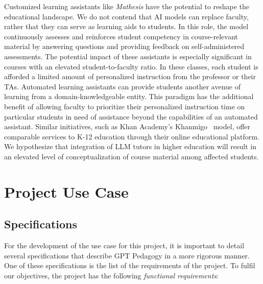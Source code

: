 \documentclass[12pt,a4paper]{article}
\begin{document}
    Customized learning assistants like \textit{Mathesis} have the potential to reshape the educational
    landscape. We do not contend that AI models can replace faculty, rather that they can serve as
    learning aids to students. In this role, the model continuously assesses and reinforces 
    student competency in course-relevant material by answering questions and providing feedback on
    self-administered assessments.  The potential impact of these assistants is especially significant
    in courses with an elevated student-to-faculty ratio.  In these classes, each student is 
    afforded a limited amount of personalized instruction from the professor or their TAs. Automated
    learning assistants can provide students another avenue of learning from a domain-knowledgeable entity.
    This paradigm has the additional benefit of allowing faculty to prioritize their personalized
    instruction time on particular students in need of assistance beyond the capabilities of an automated
    assistant.  Similar initiatives, such as Khan Academy's Khanmigo~\cite{khanmigo}
    model, offer comparable services to K-12 education through their online educational platform.
    We hypothesize that integration of LLM tutors in higher education will result in an elevated
    level of conceptualization of course material among affected students.

    \let\thefootnote\relax{}

    \let\thefootnote\relax{}

    \section{Project Use Case}

    \subsection{Specifications}

    For the development of the use case for this project, it is important to detail several
    specifications that describe GPT Pedagogy in a more rigorous manner.  One of these specifications
    is the list of the requirements of the project.  To fulfil our objectives, the
    project has the following \textit{functional requirements}:
\end{document}
